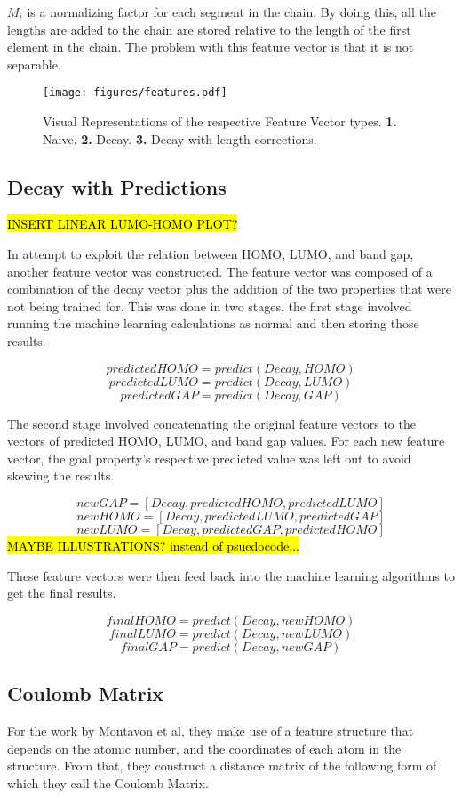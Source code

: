 \documentclass[10pt]{article}
\begin{document}
$M_i$ is a normalizing factor for each segment in the chain. By doing this, all the lengths are added to the chain are stored relative to the length of the first element in the chain. The problem with this feature vector is that it is not separable.


\begin{figure}[H]
  \begin{center}
    \texttt{[image: figures/features.pdf]}
  \end{center}
  \caption{Visual Representations of the respective Feature Vector types. \textbf{1.} Naive. \textbf{2.} Decay. \textbf{3.} Decay with length corrections.}
  \label{fig:features}
\end{figure}

\subsection{Decay with Predictions}

\hl{INSERT LINEAR LUMO-HOMO PLOT?}

In attempt to exploit the relation between HOMO, LUMO, and band gap, another feature vector was constructed. The feature vector was composed of a combination of the decay vector plus the addition of the two properties that were not being trained for. This was done in two stages, the first stage involved running the machine learning calculations as normal and then storing those results.

$$ predictedHOMO = predict(Decay, HOMO) $$
$$ predictedLUMO = predict(Decay, LUMO) $$
$$ predictedGAP = predict(Decay, GAP) $$

The second stage involved concatenating the original feature vectors to the vectors of predicted HOMO, LUMO, and band gap values. For each new feature vector, the goal property's respective predicted value was left out to avoid skewing the results.

$$ newGAP = [Decay, predictedHOMO, predictedLUMO] $$
$$ newHOMO = [Decay, predictedLUMO, predictedGAP] $$
$$ newLUMO = [Decay, predictedGAP, predictedHOMO] $$
\hl{MAYBE ILLUSTRATIONS? instead of psuedocode...}

These feature vectors were then feed back into the machine learning algorithms to get the final results.

$$ finalHOMO = predict(Decay, newHOMO) $$
$$ finalLUMO = predict(Decay, newLUMO) $$
$$ finalGAP = predict(Decay, newGAP) $$

\subsection{Coulomb Matrix}
For the work by Montavon et al, they make use of a feature structure that depends on the atomic number, and the coordinates of each atom in the structure. From that, they construct a distance matrix of the following form of which they call the Coulomb Matrix.
\end{document}
